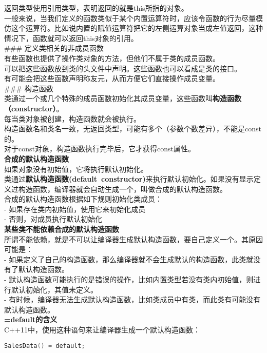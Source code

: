 \documentclass[
  a4paper,
  oneside,tablecaptionabove
]{scrbook}
\begin{document}
返回类型使用引用类型，表明返回的就是this所指的对象。\\
一般来说，当我们定义的函数类似于某个内置运算符时，应该令函数的行为尽量模仿这个运算符。比如说内置的赋值运算符把它的左侧运算对象当成左值返回，这种情况下，函数就可以返回this对象的引用。\\
\#\#\# 定义类相关的非成员函数\\
有些函数也提供了操作类对象的方法，但他们不属于类的成员函数。\\
可以把这些函数放到类的头文件中声明。这些函数也可以看成是类的接口。\\
有可能会把这些函数声明称友元，从而方便它们直接操作成员变量。\\
\#\#\# 构造函数\\
类通过一个或几个特殊的成员函数初始化其成员变量，这些函数叫\textbf{构造函数（constructor）}。\\
每当类对象被创建，构造函数就会被执行。\\
构造函数名和类名一致，无返回类型，可能有多个（参数个数差异），不能是const的。\\
对于const对象，构造函数执行完毕后，它才获得const属性。\\
\textbf{合成的默认构造函数}\\
如果对象没有初始值，它将执行默认初始化。\\
类通过\textbf{默认构造函数(default~constructor)}来执行默认初始化。如果没有显示定义过构造函数，编译器就会自动生成一个，叫做合成的默认构造函数。\\
合成的默认构造函数根据如下规则初始化类成员：\\
- 如果存在类内初始值，使用它来初始化成员\\
- 否则，对成员执行默认初始化\\
\textbf{某些类不能依赖合成的默认构造函数}\\
所谓不能依赖，就是不可以让编译器生成默认构造函数，要自己定义一个。其原因可能是：\\
-
如果定义了自己的构造函数，那么编译器就不会生成默认的构造函数，此类就没有了默认构造函数。\\
-
默认构造函数可能执行的是错误的操作，比如内置类型若没有类内初始值，则进行默认初始化，其值未定义。\\
-
有时候，编译器无法生成默认构造函数，比如类成员中有类，而此类有可能没有默认构造函数。\\
\textbf{=default的含义}\\
C++11中，使用这种语句来让编译器生成一个默认构造函数：

\begin{lstlisting}[language={C++}]
SalesData() = default;
\end{lstlisting}
\end{document}
